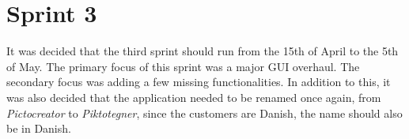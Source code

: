 \chapter{Sprint 3}
It was decided that the third sprint should run from the 15th of April to the 5th of May.
The primary focus of this sprint was a major GUI overhaul.
The secondary focus was adding a few missing functionalities.
In addition to this, it was also decided that the application needed to be renamed once again, from \textit{Pictocreator} to \textit{Piktotegner}, since the customers are Danish, the name should also be in Danish.






